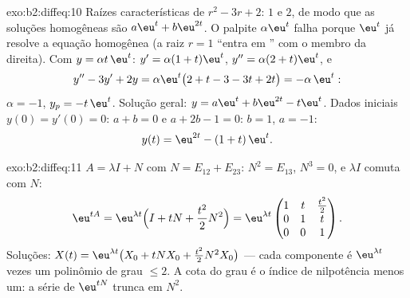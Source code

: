 \begin{solution}{exo:b2:diffeq:10}
Raízes características de $r^2 - 3r + 2$: $1$ e $2$, de modo que as
soluções homogêneas são $a\eu^t + b\eu^{2t}$. O palpite
$\alpha\eu^t$ falha porque $\eu^t$ já resolve a
equação homogênea (a raiz $r = 1$ ``entra em '' com o
membro da direita). Com $y = \alpha t\,\eu^t$: $y' = \alpha(1 +
t)\eu^t$, $y'' = \alpha(2 + t)\eu^t$, e
\[
y'' - 3y' + 2y = \alpha\eu^t\bigl(2 + t - 3 - 3t + 2t\bigr)
= -\alpha\,\eu^t :
\]
$\alpha = -1$, $y_p = -t\,\eu^t$. Solução geral: $y = a\eu^t
+ b\eu^{2t} - t\eu^t$. Dados iniciais $y(0) = y'(0) = 0$: $a + b
= 0$ e $a + 2b - 1 = 0$: $b = 1$, $a = -1$:
\[
y(t) = \eu^{2t} - (1 + t)\,\eu^{t} .
\]

\end{solution}

\begin{solution}{exo:b2:diffeq:11}
$A = \lambda I + N$ com $N = E_{12} + E_{23}$: $N^2 = E_{13}$,
$N^3 = 0$, e $\lambda I$ comuta com $N$:
\[
\eu^{tA} = \eu^{\lambda t}\Bigl(I + tN +
\frac{t^2}{2}N^2\Bigr)
= \eu^{\lambda t}\begin{pmatrix}
1 & t & \frac{t^2}{2}\\
0 & 1 & t\\
0 & 0 & 1
\end{pmatrix}.
\]
Soluções: $X(t) = \eu^{\lambda t}\bigl(X_0 + tNX_0 +
\frac{t^2}2N^2X_0\bigr)$ --- cada componente é $\eu^{\lambda
t}$ vezes um polinômio de grau $\leq 2$. A cota do grau é
o índice de nilpotência menos um: a série de $\eu^{tN}$
trunca em $N^2$.
\end{solution}

